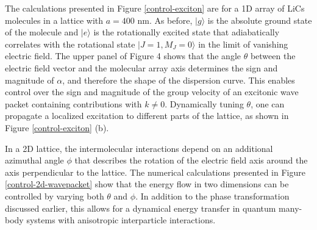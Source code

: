 The calculations presented in Figure \ref{control-exciton} are for a 1D array of LiCs molecules in a lattice with  $a=400$ nm.
As before, $|g\rangle$ is the absolute ground state of the molecule and $|e\rangle$ is the rotationally excited state
 that adiabatically correlates
with the rotational state $|J=1, M_J = 0 \rangle$ in the limit of vanishing electric field. 
The upper panel of Figure 4
shows that the angle $\theta$ between the electric field vector and the molecular array axis
determines the sign and magnitude of $\alpha$, and therefore the shape of the dispersion
curve. This enables
control over the sign and magnitude of the group velocity of an
excitonic wave packet containing contributions with $k\neq 0$. Dynamically tuning $\theta$,
one can propagate a localized excitation to different parts of the
lattice, as shown in Figure \ref{control-exciton} (b).

In a 2D lattice, the intermolecular interactions depend on an additional azimuthal angle $\phi$ that describes
 the rotation of the electric field axis around the axis perpendicular to the lattice. The numerical calculations 
presented in Figure \ref{control-2d-wavepacket} show that the energy flow in two dimensions can be  
controlled by varying both $\theta$ and $\phi$. 
In addition to the phase transformation discussed earlier, this allows for a dynamical energy transfer in quantum 
many-body systems with anisotropic interparticle interactions.



